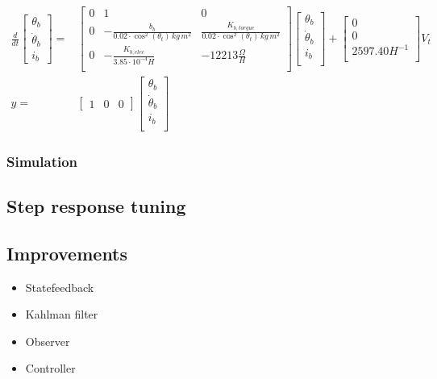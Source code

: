 \documentclass[../../main]{subfiles}
\begin{document}
\begin{equation}
      \label{eq:Theoretical_models_bottom}
      \begin{split}
      \frac{d}{dt}
          \begin{bmatrix}
              \theta_b        \\
              \dot \theta_b   \\
              i_b
          \end{bmatrix}
        =&
          \begin{bmatrix}
              0 & 1                         & 0                         \\
              0 & -\frac{b_b}{0.02\cdot \cos^2(\theta_t) \si{\,kg\,m^2}} & \frac{K_{b,torque}}{0.02\cdot \cos^2(\theta_t)\si{\,kg\,m^2}}  \\
              0 & -\frac{K_{b,elec}}{3.85\cdot 10^{-4}\si{H}}   & -12213 \si{\frac{\Omega}{H}}          \\
          \end{bmatrix}
    \begin{bmatrix}
        \theta_b        \\
        \dot \theta_b   \\
        i_b             \\
    \end{bmatrix}
        +
    \begin{bmatrix}
        0             \\
        0             \\
        2597.40 \si{H^{-1}} \\
    \end{bmatrix}
    V_t
\\
      y =&
    \begin{bmatrix}
        1 & 0 & 0
    \end{bmatrix}
    \begin{bmatrix}
        \theta_b \\
        \dot \theta_b\\
        i_b\\
    \end{bmatrix}
  \end{split}
\end{equation}


\subsubsection{Simulation}

\subsection{Step response tuning}
\label{ch:stepresponse_tuning}


\subsection{Improvements}

\begin{itemize}
  \item Statefeedback
  \item Kahlman filter
  \item Observer
  \item Controller
\end{itemize}
\end{document}
